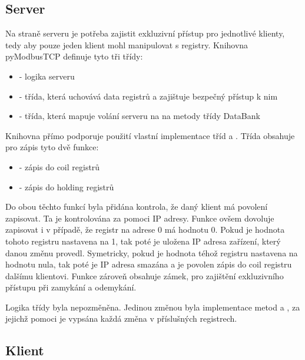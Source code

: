 \subsection{Server}

Na straně serveru je potřeba zajistit exkluzivní přístup pro jednotlivé klienty, tedy aby pouze jeden klient mohl manipulovat s registry. Knihovna pyModbusTCP definuje tyto tři třídy:

\begin{itemize}
    \item {} - logika serveru
    \item {} - třída, která uchovává data registrů a zajištuje bezpečný přístup k nim
    \item {} - třída, která mapuje volání serveru na na metody třídy DataBank
\end{itemize}

Knihovna přímo podporuje použití vlastní implementace tříd  a . Třída  obsahuje pro zápis tyto dvě funkce:

\begin{itemize}
    \item {} - zápis do coil registrů 
    \item {} - zápis do holding registrů
\end{itemize}

Do obou těchto funkcí byla přidána kontrola, že daný klient má povolení zapisovat. Ta je kontrolována za pomoci IP adresy. Funkce  ovšem dovoluje zapisovat i v případě, že registr na adrese 0 má hodnotu 0. Pokud je hodnota tohoto registru nastavena na 1, tak poté je uložena IP adresa zařízení, který danou změnu provedl. Symetricky, pokud je hodnota téhož registru nastavena na hodnotu nula, tak poté je IP adresa smazána a je povolen zápis do coil registru dalšímu klientovi. Funkce zároveň obsahuje zámek, pro zajištění exkluzivního přístupu při zamykání a odemykání. 

Logika třídy  byla nepozměněna. Jedinou změnou byla implementace metod  a , za jejichž pomoci je vypsána každá změna v příslušných registrech. 

\subsection{Klient}

